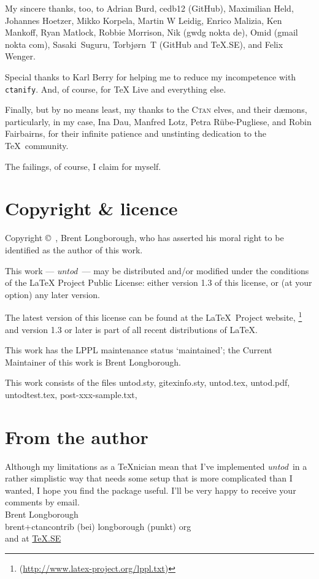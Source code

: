 \documentclass[a4paper,10pt,twoside,openany]{memoir}
\newcommand{\sfit}[1]{\textit{#1}}
\newcommand{\tpname}{\sfit{untod}}
\begin{document}
My sincere thanks, too, to
Adrian Burd,
cedb12 (GitHub),
Maximilian Held,
Johannes Hoetzer,
Mikko Korpela,
Martin W Leidig,
Enrico Malizia,
Ken Mankoff,
Ryan Matlock,
Robbie Morrison,
Nik (gwdg nokta de),
Omid (gmail nokta com),
Sasaki~Suguru,
Tor\-bjørn~T (GitHub and TeX.SE),
and
Felix Wenger.

Special thanks to Karl Berry for helping me to
reduce my incompetence with \texttt{ctanify}.
And, of course, for \TeX{} Live and everything else.

Finally, but by no means least,
my thanks to the \textsc{Ctan} elves, and their dæmons,
particularly, in my case,
Ina Dau,
Manfred Lotz, 
Petra Rübe-Pugliese,
and 
Robin Fairbairns, 
for their infinite patience and unstinting
dedication to the \TeX\ community.

The failings, of course, I claim for myself.

\clearpage
\section{Copyright \& licence}
Copyright \copyright\ , Brent Longborough,
who has asserted his moral right
to be identified as the author of this work.

This work --- \tpname\ --- may be distributed and/or modified under the
conditions of the LaTeX Project Public License: either version 1.3
of this license, or (at your option) any later version.

The latest version of this license can be found
at the \LaTeX\ Project website,%
\footnote{(\url{http://www.latex-project.org/lppl.txt})}
and version 1.3 or later is part of all recent distributions of
\LaTeX.

This work has the LPPL maintenance status `maintained';
the Current Maintainer of this work is Brent Longborough.

This work consists of the files
untod.sty, gitexinfo.sty, untod.tex, untod.pdf,
untodtest.tex, post-xxx-sample.txt,

\section{From the author}
Although my limitations as a \TeX nician
mean that I've implemented \tpname\ in a rather simplistic way
that needs some setup that is more complicated than I wanted,
I hope you find the package useful.
I'll be very happy to receive your comments by email.\\[\baselineskip]
Brent Longborough\\[\baselineskip]
\textsf{brent+ctancontrib (bei) longborough (punkt) org}\\
and at \href{http://tex.stackexchange.com/users/344/brent-longborough}{\TeX.SE}
\clearpage
\raggedright
\printpagenotes
\end{document}
